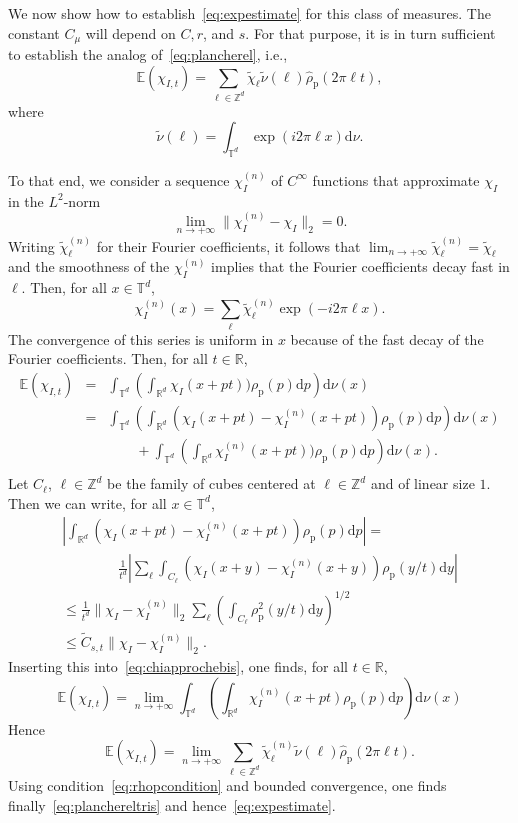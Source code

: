 \documentclass{article}
\newcommand {\E}{\mathbb{E}}
\newcommand {\Z}{\mathbb{Z}}
\newcommand {\R}{\mathbb{R}}
\newcommand {\rd}{\mathrm{d}}
\newcommand {\T}{\mathbb{T}}
\numberwithin{equation}{section}
\begin{document}
We now show how to establish~\eqref{eq:expestimate} for this class of measures.
The constant $C_\mu$ will depend on $C,r$, and $s$.
For that purpose, it is in turn sufficient to establish the analog of~\eqref{eq:plancherel}, i.e.,
\begin{equation}\label{eq:planchereltris}
\E(\chi_{I,t})=\sum_{\ell\in\Z^d}\tilde\chi_\ell\tilde\nu(\ell)\hat\rho_{\mathrm{p}}(2\pi\ell t),
\end{equation}
where
$$
\tilde\nu(\ell) = \int_{\T^d}\exp(i2\pi\ell x) \rd \nu.
$$


To that end, we consider a sequence $\chi_I^{(n)}$ of $C^{\infty}$ functions that approximate $\chi_I$ in  the $L^2$-norm
\begin{equation}\label{eq:smoothapprox}
\lim_{n\to+\infty} \|\chi_I^{(n)}-\chi_I\|_2=0.
\end{equation}
Writing $\tilde\chi_\ell^{(n)}$ for their Fourier coefficients, it follows that $\lim_{n\to+\infty}\tilde\chi_\ell^{(n)}=\tilde\chi_{\ell}$
and the smoothness of the $\chi_I^{(n)}$ implies that the Fourier coefficients
decay fast in $\ell$. Then, for all $x\in\T^d$,
$$
\chi_I^{(n)}(x)=\sum_{\ell} \tilde\chi_{\ell}^{(n)}\exp(-i2\pi \ell x).
$$
The convergence of this series is uniform in $x$ because of the fast decay of the Fourier coefficients. Then, for all $t\in\R$,
\begin{eqnarray}
\E(\chi_{I,t})&=&\int_{\T^d}\left(\int_{\R^d} \chi_I(x+pt))\rho_{\mathrm{p}}(p) \rd p\right)\rd\nu(x)\nonumber\\
&=&\int_{\T^d}\left(\int_{\R^d} \left(\chi_I(x+pt)-\chi_I^{(n)}(x+pt)\right)\rho_{\mathrm{p}}(p) \rd p\right)\rd\nu(x)\nonumber\nonumber\\
&\ &\qquad+\int_{\T^d}\left(\int_{\R^d} \chi_I^{(n)}(x+pt))\rho_{\mathrm{p}}(p) \rd p\right)\rd\nu(x).\nonumber\\\label{eq:chiapprochebis}
\end{eqnarray}
Let $C_\ell$, $\ell\in\Z^d$ be the family of cubes centered at $\ell\in\Z^d$ and of linear size $1$. Then we can write, for all $x\in\T^d$,
\begin{eqnarray*}
|\int_{\R^d} \left(\chi_I(x+pt)-\chi_I^{(n)}(x+pt)\right)\rho_{\mathrm{p}}(p)\rd p|=\qquad\qquad\\
\qquad\qquad\frac1{t^d}|\sum_\ell\int_{C_\ell}\left(\chi_I(x+y)-\chi_I^{(n)}(x+y)\right)\rho_{\mathrm{p}}(y/t)\rd y|\\
\leq\frac1{t^d}\|\chi_I-\chi_I^{(n)}\|_2\sum_\ell\left(\int_{C_\ell}\rho_{\mathrm{p}}^2(y/t)\rd y\right)^{1/2}\qquad\\
\leq \tilde{C}_{s,t}\|\chi_I-\chi_I^{(n)}\|_2.\qquad\qquad\qquad\qquad\qquad\quad
\end{eqnarray*}
Inserting this into~\eqref{eq:chiapprochebis}, one finds, for all $t\in\R$,
$$
\E(\chi_{I,t})=\lim_{n\to+\infty}\int_{\T^d}\left(\int_{\R^d} \chi_I^{(n)}(x+pt)\rho_{\mathrm{p}}(p) \rd p\right)\rd\nu(x)
$$
Hence
$$
\E(\chi_{I,t})=\lim_{n\to+\infty}\sum_{\ell\in\Z^d}\tilde\chi_\ell^{(n)}\tilde\nu(\ell)\hat\rho_{\mathrm{p}}(2\pi\ell t).
$$
Using condition~\eqref{eq:rhopcondition} and bounded convergence, one finds finally~\eqref{eq:planchereltris} and hence~\eqref{eq:expestimate}.
\end{document}
